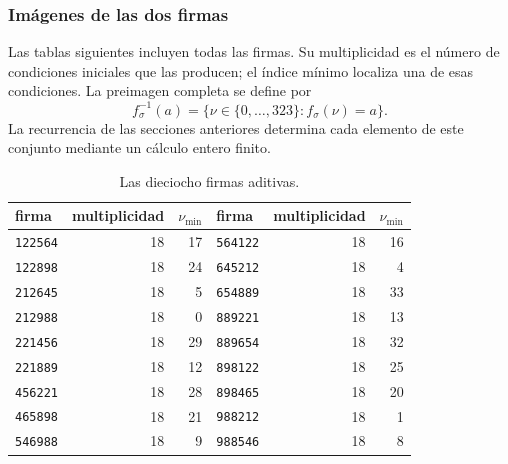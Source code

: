 \par\noindent\begin{minipage}{\linewidth}
\subsubsection{Imágenes de las dos firmas}

Las tablas siguientes incluyen todas las firmas. Su multiplicidad es el
número de condiciones iniciales que las producen; el índice mínimo localiza
una de esas condiciones. La preimagen completa se define por
\[
 f_\sigma^{-1}(a)=\{\nu\in\{0,\ldots,323\}:f_\sigma(\nu)=a\}.
\]
La recurrencia de las secciones anteriores determina cada elemento de este
conjunto mediante un cálculo entero finito.

\begin{table}[H]
\centering\fontsize{9.5}{11.4}\selectfont
\setlength{\abovecaptionskip}{8pt}\setlength{\belowcaptionskip}{6pt}
\renewcommand{\arraystretch}{1.12}
\caption{Las dieciocho firmas aditivas.}
\label{act21:tpk:firmas-aditivas}
\begin{tabular}{@{}lrr@{\qquad}lrr@{}}
\toprule
firma&multiplicidad&\(\nu_{\min}\)&firma&multiplicidad&\(\nu_{\min}\)\\
\midrule
\texttt{122564}&18&17&\texttt{564122}&18&16\\
\texttt{122898}&18&24&\texttt{645212}&18&4\\
\texttt{212645}&18&5&\texttt{654889}&18&33\\
\texttt{212988}&18&0&\texttt{889221}&18&13\\
\texttt{221456}&18&29&\texttt{889654}&18&32\\
\texttt{221889}&18&12&\texttt{898122}&18&25\\
\texttt{456221}&18&28&\texttt{898465}&18&20\\
\texttt{465898}&18&21&\texttt{988212}&18&1\\
\texttt{546988}&18&9&\texttt{988546}&18&8\\
\bottomrule
\end{tabular}

\par\vspace{12pt}


\end{table}
\end{minipage}
